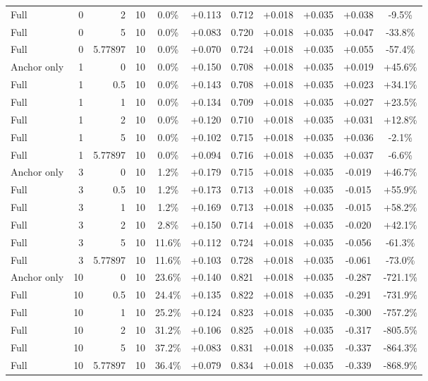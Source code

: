 \begin{table}[htbp]
\begin{tabular}{lrrrccccccc}
Full & 0 & 2 & 10 & 0.0\% & +0.113 & 0.712 & +0.018 & +0.035 & +0.038 & -9.5\% \\
Full & 0 & 5 & 10 & 0.0\% & +0.083 & 0.720 & +0.018 & +0.035 & +0.047 & -33.8\% \\
Full & 0 & 5.77897 & 10 & 0.0\% & +0.070 & 0.724 & +0.018 & +0.035 & +0.055 & -57.4\% \\
Anchor only & 1 & 0 & 10 & 0.0\% & +0.150 & 0.708 & +0.018 & +0.035 & +0.019 & +45.6\% \\
Full & 1 & 0.5 & 10 & 0.0\% & +0.143 & 0.708 & +0.018 & +0.035 & +0.023 & +34.1\% \\
Full & 1 & 1 & 10 & 0.0\% & +0.134 & 0.709 & +0.018 & +0.035 & +0.027 & +23.5\% \\
Full & 1 & 2 & 10 & 0.0\% & +0.120 & 0.710 & +0.018 & +0.035 & +0.031 & +12.8\% \\
Full & 1 & 5 & 10 & 0.0\% & +0.102 & 0.715 & +0.018 & +0.035 & +0.036 & -2.1\% \\
Full & 1 & 5.77897 & 10 & 0.0\% & +0.094 & 0.716 & +0.018 & +0.035 & +0.037 & -6.6\% \\
Anchor only & 3 & 0 & 10 & 1.2\% & +0.179 & 0.715 & +0.018 & +0.035 & -0.019 & +46.7\% \\
Full & 3 & 0.5 & 10 & 1.2\% & +0.173 & 0.713 & +0.018 & +0.035 & -0.015 & +55.9\% \\
Full & 3 & 1 & 10 & 1.2\% & +0.169 & 0.713 & +0.018 & +0.035 & -0.015 & +58.2\% \\
Full & 3 & 2 & 10 & 2.8\% & +0.150 & 0.714 & +0.018 & +0.035 & -0.020 & +42.1\% \\
Full & 3 & 5 & 10 & 11.6\% & +0.112 & 0.724 & +0.018 & +0.035 & -0.056 & -61.3\% \\
Full & 3 & 5.77897 & 10 & 11.6\% & +0.103 & 0.728 & +0.018 & +0.035 & -0.061 & -73.0\% \\
Anchor only & 10 & 0 & 10 & 23.6\% & +0.140 & 0.821 & +0.018 & +0.035 & -0.287 & -721.1\% \\
Full & 10 & 0.5 & 10 & 24.4\% & +0.135 & 0.822 & +0.018 & +0.035 & -0.291 & -731.9\% \\
Full & 10 & 1 & 10 & 25.2\% & +0.124 & 0.823 & +0.018 & +0.035 & -0.300 & -757.2\% \\
Full & 10 & 2 & 10 & 31.2\% & +0.106 & 0.825 & +0.018 & +0.035 & -0.317 & -805.5\% \\
Full & 10 & 5 & 10 & 37.2\% & +0.083 & 0.831 & +0.018 & +0.035 & -0.337 & -864.3\% \\
Full & 10 & 5.77897 & 10 & 36.4\% & +0.079 & 0.834 & +0.018 & +0.035 & -0.339 & -868.9\% \\

\end{tabular}
\end{table}

